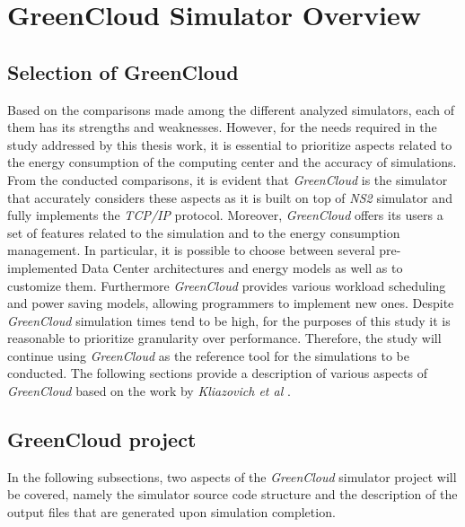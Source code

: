 \chapter{GreenCloud Simulator Overview}

\begin{citazione}

\end{citazione}
\newpage

\section{Selection of GreenCloud} 
Based on the comparisons made among the different analyzed simulators, each of them has its strengths and weaknesses. However, for the needs required in the study addressed by this thesis work, it is essential to prioritize aspects related to the energy consumption of the computing center and the accuracy of simulations. From the conducted comparisons, it is evident that \emph{GreenCloud} is the simulator that accurately considers these aspects as it is built on top of \emph{NS2} simulator and fully implements the \emph{TCP/IP} protocol. Moreover, \emph{GreenCloud} offers its users a set of features related to the simulation and to the energy consumption management. In particular, it is possible to choose between several pre-implemented Data Center architectures and energy models as well as to customize them. Furthermore \emph{GreenCloud} provides various workload scheduling and power saving models, allowing programmers to implement new ones. Despite \emph{GreenCloud} simulation times tend to be high, for the purposes of this study it is reasonable to prioritize granularity over performance. Therefore, the study will continue using \emph{GreenCloud} as the reference tool for the simulations to be conducted. The following sections provide a description of various aspects of \emph{GreenCloud} based on the work by \emph{Kliazovich et al} \cite{kliazovich2012greencloud}.

\section{GreenCloud project}
In the following subsections, two aspects of the \emph{GreenCloud} simulator project will be covered, namely the simulator source code structure and the description of the output files that are generated upon simulation completion.  
